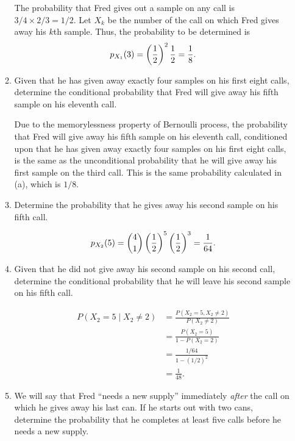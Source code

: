\begin{enumerate}
\begin{enumerate}
    The probability that Fred gives out a sample on any call is
    \(3/4 \times 2/3 = 1/2\).  Let \(X_k\) be the number of the call
    on which Fred gives away his \(k\)th sample.  Thus, the
    probability to be determined is
    \[p_{X_1}(3) = \left( \frac12 \right)^2 \frac12 = \frac18.\]

  \item {} Given that he has given away exactly
    four samples on his first eight calls, determine the conditional
    probability that Fred will give away his fifth sample on his
    eleventh call.

    Due to the memorylessness property of Bernoulli process, the
    probability that Fred will give away his fifth sample on his
    eleventh call, conditioned upon that he has given away exactly
    four samples on his first eight calls, is the same as the
    unconditional probability that he will give away his first sample
    on the third call.  This is the same probability calculated in
    (a), which is \(1/8\).

  \item {} Determine the probability that he
    gives away his second sample on his fifth call.

    \[p_{X_2}(5) = \binom{4}{1} \left( \frac12 \right)^5 \left( \frac12 \right)^3 = \frac{1}{64}.\]

  \item {} Given that he did not give away
    his second sample on his second call, determine the conditional
    probability that he will leave his second sample on his fifth
    call.

    \begin{align*}
      P(X_2 = 5 \mid X_2 \ne 2) &= \frac{P(X_2 = 5, X_2 \ne 2)}{P(X_2 \ne 2)} \\
                                &= \frac{P(X_2 = 5)}{1 - P(X_2 = 2)} \\
                                &= \frac{1/64}{1 - (1/2)^2} \\
                                &= \frac{1}{48}.
    \end{align*}

  \item {} We will say that Fred “needs a new
    supply” immediately \emph{after} the call on which he gives away
    his last can.  If he starts out with two cans, determine the
    probability that he completes at least five calls before he needs
    a new supply.


\end{enumerate}
\end{enumerate}
